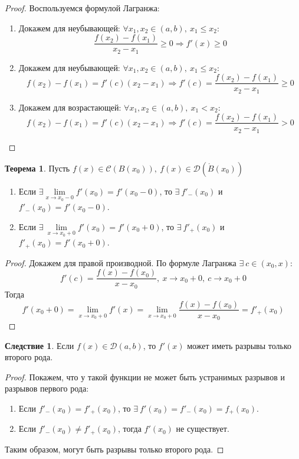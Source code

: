 \documentclass[a4paper, 12pt]{article}
\theoremstyle{definition}
\newtheorem*{theorem}{Теорема}
\newtheorem*{consequense}{Следствие}
\begin{document}
        \begin{proof}Воспользуемся формулой Лагранжа:
            \begin{enumerate}
                \item Докажем для неубывающей: $\forall x_1,x_2\in (a,b),\ x_1\leq x_2:$
                \[\frac{f(x_2)-f(x_1)}{x_2-x_1}\geq 0 \Rightarrow f'(x)\geq 0\]
                \item Докажем для неубывающей: $\forall x_1,x_2\in (a,b),\ x_1\leq x_2:$ 
                \[f(x_2)-f(x_1)=f'(c)(x_2-x_1) \Rightarrow f'(c)=\frac{f(x_2)-f(x_1)}{x_2-x_1}\geq 0\]
                \item Докажем для возрастающей: $\forall x_1,x_2\in (a,b),\ x_1< x_2:$ 
                \[f(x_2)-f(x_1)=f'(c)(x_2-x_1) \Rightarrow f'(c)=\frac{f(x_2)-f(x_1)}{x_2-x_1}> 0\]
            \end{enumerate}
        \end{proof} 
        \begin{theorem}
            Пусть $f(x)\in \mathcal{C}(B(x_0)),\ f(x)\in \mathcal{D}(\mathring{B}(x_0))$
            \begin{enumerate}
                \item Если $\exists \lim\limits_{x\to x_0-0}f'(x_0)=f'(x_0-0)$, то $\exists\ f'_-(x_0)$ и $f'_-(x_0)=f'(x_0-0)$. 
                \item Если $\exists\ \lim\limits_{x\to x_0+0}f'(x_0)=f'(x_0+0)$, то $\exists\ f'_+(x_0)$ и $f'_+(x_0)=f'(x_0+0)$.
            \end{enumerate}
        \end{theorem}
        \begin{proof} Докажем для правой производной. По формуле Лагранжа $\exists\ c\in (x_0, x)$:
            \[f'(c)=\frac{f(x)-f(x_0)}{x-x_0},\ x\to x_0+0,\ c\to x_0+0\]
            Тогда 
            \[f'(x_0+0)=\lim\limits_{x\to x_0+0}f'(x)=\lim\limits_{x\to x_0+0}\frac{f(x)-f(x_0)}{x-x_0}=f'_+(x_0)\]
        \end{proof} 
        \begin{consequense}
            Если $f(x)\in \mathcal{D}(a,b)$, то $f'(x)$ может иметь разрывы только второго рода.
        \end{consequense} 
        \begin{proof} Покажем, что у такой функции не может быть устранимых разрывов и разрывов первого рода:
            \begin{enumerate}
                \item Если $f'_-(x_0)=f'_+(x_0)$, то $\exists\ f'(x_0)=f'_-(x_0)=f_+(x_0)$.
                \item Если $f'_-(x_0)\ne f'_+(x_0)$, тогда $f'(x_0)$ не существует.
            \end{enumerate}
            Таким образом, могут быть разрывы только второго рода.
        \end{proof} 
\end{document}
